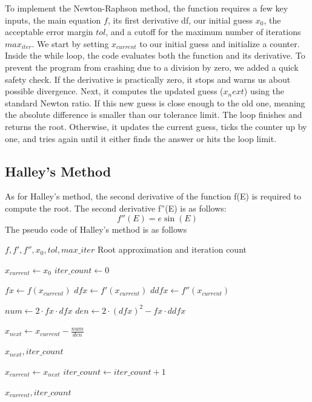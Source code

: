 \documentclass[a4paper,11pt]{article}
\begin{document}
To implement the Newton-Raphson method, the function requires a few key inputs, the main equation $f$, its first derivative df, our initial guess $x_0$, the acceptable error margin $tol$, and a cutoff for the maximum number of iterations $max_{iter}$. We start by setting $x_{current}$ to our initial guess and initialize a counter. Inside the while loop, the code evaluates both the function and its derivative. To prevent the program from crashing due to a division by zero, we added a quick safety check. If the derivative is practically zero, it stops and warns us about possible divergence. Next, it computes the updated guess ($x_next$) using the standard Newton ratio. If this new guess is close enough to the old one, meaning the absolute difference is smaller than our tolerance limit. The loop finishes and returns the root. Otherwise, it updates the current guess, ticks the counter up by one, and tries again until it either finds the answer or hits the loop limit.

\subsection{Halley's Method}

	As for Halley's method, the second derivative of the function f(E) is required to compute the root. The second derivative f''(E) is as follows:
\begin{equation*}
f''(E) = e \sin(E)
\end{equation*}
The pseudo code of Halley's method is as follows


\begin{algorithm}
\caption{Halley's Method}
\begin{algorithmic}[1]
    \Require $f, f', f'', x_0, tol, max\_iter$
    \Ensure Root approximation and iteration count
    
    \State $x_{current} \gets x_0$
    \State $iter\_count \gets 0$

        \State $fx \gets f(x_{current})$
        \State $dfx \gets f'(x_{current})$
        \State $ddfx \gets f''(x_{current})$

        \State $num \gets 2 \cdot fx \cdot dfx$
        \State $den \gets 2 \cdot (dfx)^2 - fx \cdot ddfx$
        
        \State $x_{next} \gets x_{current} - \frac{num}{den}$

            \State \Return $x_{next}, iter\_count$
        \EndIf

        \State $x_{current} \gets x_{next}$
        \State $iter\_count \gets iter\_count + 1$
    \EndWhile

    \State \Return $x_{current}, iter\_count$
\end{algorithmic}
\end{algorithm}
\end{document}
